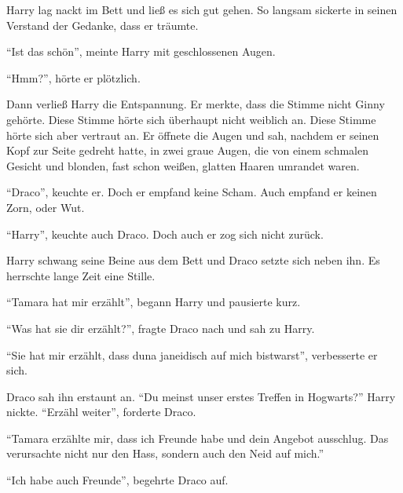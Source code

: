 \trenn

Harry lag nackt im Bett und ließ es sich gut gehen. So langsam sickerte in seinen Verstand der Gedanke, dass er träumte.

\enquote{Ist das schön}, meinte Harry mit geschlossenen Augen.

\enquote{Hmm?}, hörte er plötzlich.

Dann verließ Harry die Entspannung. Er merkte, dass die Stimme nicht Ginny gehörte. Diese Stimme hörte sich überhaupt nicht weiblich an. Diese Stimme hörte sich aber vertraut an. Er öffnete die Augen und sah, nachdem er seinen Kopf zur Seite gedreht hatte, in zwei graue Augen, die von einem schmalen Gesicht und blonden, fast schon weißen, glatten Haaren umrandet waren.

\enquote{Draco}, keuchte er. Doch er empfand keine Scham. Auch empfand er keinen Zorn, oder Wut.

\enquote{Harry}, keuchte auch Draco. Doch auch er zog sich nicht zurück.

Harry schwang seine Beine aus dem Bett und Draco setzte sich neben ihn. Es herrschte lange Zeit eine Stille.

\enquote{Tamara hat mir erzählt\abs}, begann Harry und pausierte kurz.

\enquote{Was hat sie dir erzählt?}, fragte Draco nach und sah zu Harry.

\enquote{Sie hat mir erzählt, dass du\abs na ja\abs neidisch auf mich bist\abs warst}, verbesserte er sich.

Draco sah ihn erstaunt an. \enquote{Du meinst unser erstes Treffen in Hogwarts?} Harry nickte. \enquote{Erzähl weiter}, forderte Draco.

\enquote{Tamara erzählte mir, dass ich Freunde habe und dein Angebot ausschlug. Das verursachte nicht nur den Hass, sondern auch den Neid auf mich.}

\enquote{Ich habe auch Freunde}, begehrte Draco auf.

